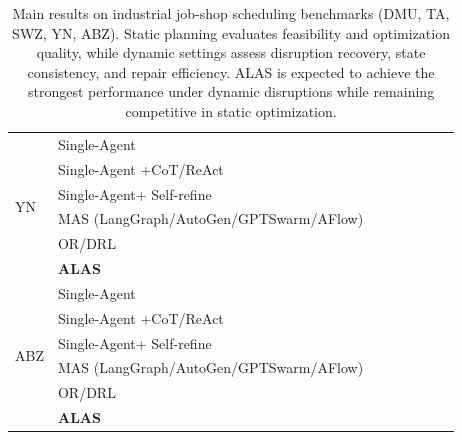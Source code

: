 \documentclass[11pt]{article}
\begin{document}
\begin{table}[t]
{\begin{tabular}{l|l|ccc|ccc}
  \midrule
  
  \multirow{6}{*}{YN} 
  & Single-Agent &  &  &  &  &  &  \\
  & Single-Agent +CoT/ReAct &  &  &  &  &  &  \\
  & Single-Agent+ Self-refine &  &  &  &  &  &  \\
  & MAS (LangGraph/AutoGen/GPTSwarm/AFlow) &  &  &  &  &  &  \\
  & OR/DRL &  &  &  &  &  &  \\
  & \textbf{ALAS} &  &  &  &  &  &  \\
  
  \midrule
  
  \multirow{6}{*}{ABZ} 
  & Single-Agent &  &  &  &  &  &  \\
  & Single-Agent +CoT/ReAct &  &  &  &  &  &  \\
  & Single-Agent+ Self-refine &  &  &  &  &  &  \\
  & MAS (LangGraph/AutoGen/GPTSwarm/AFlow) &  &  &  &  &  &  \\
  & OR/DRL &  &  &  &  &  &  \\
  & \textbf{ALAS} &  &  &  &  &  &  \\
  
  \bottomrule
  \end{tabular}
  }
  \caption{
  Main results on industrial job-shop scheduling benchmarks (DMU, TA, SWZ, YN, ABZ).
  Static planning evaluates feasibility and optimization quality, while dynamic settings assess disruption recovery,
  state consistency, and repair efficiency. ALAS is expected to achieve the strongest performance under dynamic disruptions
  while remaining competitive in static optimization.
  }
  \label{tab:main_benchmark}
  \end{table}
\end{document}
